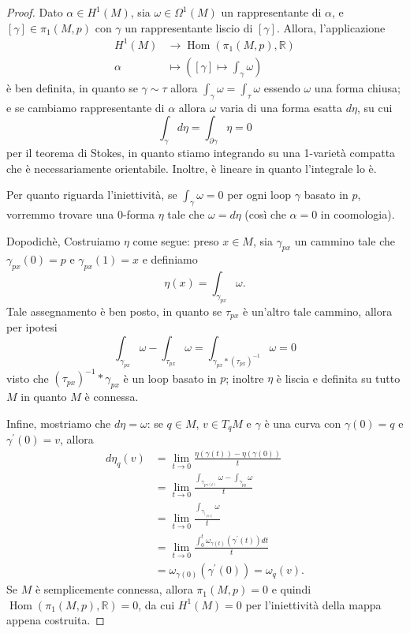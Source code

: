 \documentclass[a4paper]{article}
\newcommand{\R}{\mathbb{R}}
\newcommand{\Hom}{\operatorname{Hom}}
\theoremstyle{definition}
\theoremstyle{definition}
\theoremstyle{remark}
\theoremstyle{definition}
\begin{document}
\begin{proof}
    Dato $\alpha\in H^1(M)$, sia $\omega \in \Omega^1(M)$ un rappresentante di $\alpha$, e $[\gamma] \in \pi_1(M, p)$ con $\gamma$ un rappresentante liscio di $[\gamma]$. Allora, l'applicazione
    \[
        \begin{aligned}
            H^1(M) & \longrightarrow \Hom(\pi_1(M, p), \R)                          \\
            \alpha & \longmapsto \left([\gamma] \mapsto \int_{\gamma} \omega\right)
        \end{aligned}
    \]
    è ben definita, in quanto se $\gamma \sim \tau$ allora $\int_{\gamma} \omega = \int_{\tau} \omega$ essendo $\omega$ una forma chiusa; e se cambiamo rappresentante
    di $\alpha$ allora $\omega$ varia di una forma esatta $d \eta$, su cui
    \[
        \int_{\gamma} d\eta = \int_{\partial \gamma} \eta = 0
    \]
    per il teorema di Stokes, in quanto stiamo integrando su una 1-varietà compatta che è necessariamente orientabile.
    Inoltre, è lineare in quanto l'integrale lo è.

    Per quanto riguarda l'iniettività, se $\int_{\gamma} \omega = 0$ per ogni loop $\gamma$ basato in $p$, vorremmo trovare una $0$-forma $\eta$ tale che $\omega = d\eta$ (così che
    $\alpha = 0$ in coomologia).

    Dopodichè, Costruiamo $\eta$ come segue: preso $x\in M$, sia $\gamma_{px}$ un cammino tale che $\gamma_{px}(0)=p$ e $\gamma_{px}(1)=x$ e definiamo
    \[
        \eta(x) = \int_{\gamma_{px}} \omega
        .\]
    Tale assegnamento è ben posto, in quanto se $\tau_{px}$ è un'altro tale cammino, allora per ipotesi
    \[
        \int_{\gamma_{px}} \omega - \int_{\tau_{px}} \omega = \int_{\gamma_{px}\ast(\tau_{px})^{-1} } \omega = 0
    \]
    visto che $(\tau_{px})^{-1}\ast \gamma_{px}$ è un loop basato in $p$; inoltre $\eta$ è liscia e definita su tutto $M$ in quanto $M$ è connessa.

    Infine, mostriamo che
    \(
    d\eta = \omega
    \): se $q\in M$, $v\in T_qM$ e $\gamma$ è una curva con $\gamma(0)=q$ e $\gamma^\prime(0)=v$, allora
    \[
        \begin{aligned}
            d\eta_q(v) & =\lim_{t\to 0} \frac{\eta(\gamma(t))-\eta(\gamma(0))}{t}                                \\
                       & = \lim_{t\to 0} \frac{\int_{\gamma_{p\gamma(t)}} \omega - \int_{\gamma_{pq}} \omega}{t} \\
                       & = \lim_{t\to 0} \frac{\int_{\gamma_{|_{[0, t]}}} \omega}{t}                             \\
                       & = \lim_{t\to 0} \frac{\int_{0}^{t} \omega_{\gamma(t)}(\gamma^\prime(t)) dt}{t}          \\
                       & = \omega_{\gamma(0)}(\gamma^\prime(0)) = \omega_q(v).
        \end{aligned}
    \]
    Se $M$ è semplicemente connessa, allora $\pi_1(M, p) = 0$ e quindi $\Hom(\pi_1(M, p), \R) = 0$, da cui $H^1(M) = 0$ per l'iniettività della mappa appena costruita.
\end{proof}
\end{document}
